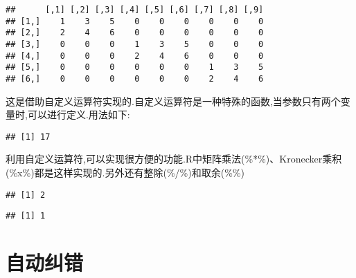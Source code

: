 \documentclass[]{ctexbook}
\newenvironment{Shaded}{\begin{snugshade}}{\end{snugshade}}
\newcommand{\ControlFlowTok}[1]{\textcolor[rgb]{0.13,0.29,0.53}{\textbf{#1}}}
\newcommand{\DecValTok}[1]{\textcolor[rgb]{0.00,0.00,0.81}{#1}}
\newcommand{\NormalTok}[1]{#1}
\newcommand{\OperatorTok}[1]{\textcolor[rgb]{0.81,0.36,0.00}{\textbf{#1}}}
\newcommand{\StringTok}[1]{\textcolor[rgb]{0.31,0.60,0.02}{#1}}
\begin{document}
\begin{verbatim}
##      [,1] [,2] [,3] [,4] [,5] [,6] [,7] [,8] [,9]
## [1,]    1    3    5    0    0    0    0    0    0
## [2,]    2    4    6    0    0    0    0    0    0
## [3,]    0    0    0    1    3    5    0    0    0
## [4,]    0    0    0    2    4    6    0    0    0
## [5,]    0    0    0    0    0    0    1    3    5
## [6,]    0    0    0    0    0    0    2    4    6
\end{verbatim}

这是借助自定义运算符实现的.自定义运算符是一种特殊的函数,当参数只有两个变量时,可以进行定义.用法如下:

\begin{Shaded}
\end{Shaded}

\begin{verbatim}
## [1] 17
\end{verbatim}

利用自定义运算符,可以实现很方便的功能.R中矩阵乘法(\%*\%)、Kronecker乘积(\%x\%)都是这样实现的.另外还有整除(\%/\%)和取余(\%\%)

\begin{Shaded}
\end{Shaded}

\begin{verbatim}
## [1] 2
\end{verbatim}

\begin{Shaded}
\end{Shaded}

\begin{verbatim}
## [1] 1
\end{verbatim}

\hypertarget{section-5}{%
\section{自动纠错}\label{section-5}}
\end{document}

